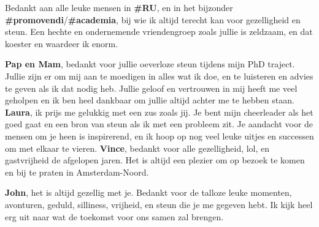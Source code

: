 Bedankt aan alle leuke mensen in \textbf{\#RU}, en in het bijzonder \textbf{\#promovendi}/\textbf{\#academia}, bij wie ik altijd terecht kan voor gezelligheid en steun. Een hechte en ondernemende vriendengroep zoals jullie is zeldzaam, en dat koester en waardeer ik enorm.

\textbf{Pap en Mam}, bedankt voor jullie oeverloze steun tijdens mijn PhD traject. Jullie zijn er om mij aan te moedigen in alles wat ik doe, en te luisteren en advies te geven als ik dat nodig heb. Jullie geloof en vertrouwen in mij heeft me veel geholpen en ik ben heel dankbaar om jullie altijd achter me te hebben staan. 
\textbf{Laura}, ik prijs me gelukkig met een zus zoals jij. Je bent mijn cheerleader als het goed gaat en een bron van steun als ik met een probleem zit. Je aandacht voor de mensen om je heen is inspirerend, en ik hoop op nog veel leuke uitjes en successen om met elkaar te vieren. \textbf{Vince}, bedankt voor alle gezelligheid, lol, en gastvrijheid de afgelopen jaren. Het is altijd een plezier om op bezoek te komen en bij te praten in Amsterdam-Noord. 

\textbf{John}, het is altijd gezellig met je. Bedankt voor de talloze leuke momenten, avonturen, geduld, silliness, vrijheid, en steun die je me gegeven hebt. Ik kijk heel erg uit naar wat de toekomst voor ons samen zal brengen.  





